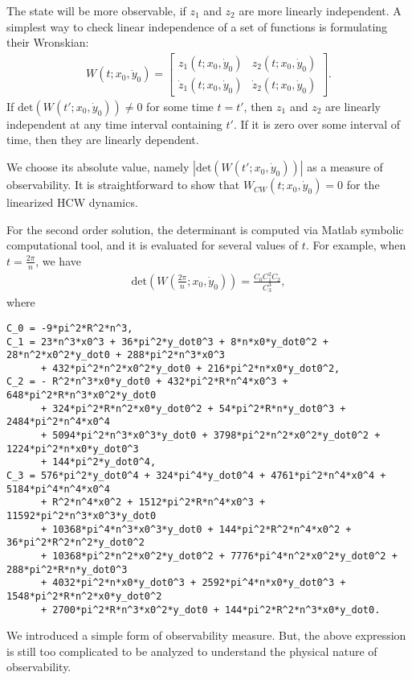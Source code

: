 \documentclass[10pt]{article}
\begin{document}
The state will be more observable, if $z_1$ and $z_2$ are more linearly independent. A simplest way to check linear independence of a set of functions is formulating their Wronskian:
\begin{align*}
W(t;x_0,\dot y_0) = \begin{bmatrix} z_1(t;x_0,\dot y_0) & z_2(t;x_0,\dot y_0)\\
\dot z_1(t;x_0,\dot y_0) & \dot z_2(t;x_0,\dot y_0)
\end{bmatrix}.
\end{align*}
If $\mathrm{det}(W(t';x_0,\dot y_0))\neq 0$ for some time $t=t'$, then $z_1$ and $z_2$ are linearly independent at any time interval containing $t'$. If it is zero over some interval of time, then they are linearly dependent.

We choose its absolute value, namely $|\mathrm{det}(W(t';x_0,\dot y_0))|$ as a measure of observability. It is straightforward to show that $W_{CW}(t;x_0,\dot y_0)=0$ for the linearized HCW dynamics. 

For the second order solution, the determinant is computed via Matlab symbolic computational tool, and it is evaluated for several values of $t$. For example, when $t=\frac{2\pi}{n}$, we have
\begin{align}
\mathrm{det}(W(\frac{2\pi}{n};x_0,\dot y_0)) = \frac{C_0 C_1^2 C_2}{C_3^3},
\end{align}
where
{\small
\begin{verbatim}
C_0 = -9*pi^2*R^2*n^3,
C_1 = 23*n^3*x0^3 + 36*pi^2*y_dot0^3 + 8*n*x0*y_dot0^2 + 28*n^2*x0^2*y_dot0 + 288*pi^2*n^3*x0^3 
      + 432*pi^2*n^2*x0^2*y_dot0 + 216*pi^2*n*x0*y_dot0^2,
C_2 = - R^2*n^3*x0*y_dot0 + 432*pi^2*R*n^4*x0^3 + 648*pi^2*R*n^3*x0^2*y_dot0 
      + 324*pi^2*R*n^2*x0*y_dot0^2 + 54*pi^2*R*n*y_dot0^3 + 2484*pi^2*n^4*x0^4 
      + 5094*pi^2*n^3*x0^3*y_dot0 + 3798*pi^2*n^2*x0^2*y_dot0^2 + 1224*pi^2*n*x0*y_dot0^3 
      + 144*pi^2*y_dot0^4,
C_3 = 576*pi^2*y_dot0^4 + 324*pi^4*y_dot0^4 + 4761*pi^2*n^4*x0^4 + 5184*pi^4*n^4*x0^4 
      + R^2*n^4*x0^2 + 1512*pi^2*R*n^4*x0^3 + 11592*pi^2*n^3*x0^3*y_dot0 
      + 10368*pi^4*n^3*x0^3*y_dot0 + 144*pi^2*R^2*n^4*x0^2 + 36*pi^2*R^2*n^2*y_dot0^2 
      + 10368*pi^2*n^2*x0^2*y_dot0^2 + 7776*pi^4*n^2*x0^2*y_dot0^2 + 288*pi^2*R*n*y_dot0^3 
      + 4032*pi^2*n*x0*y_dot0^3 + 2592*pi^4*n*x0*y_dot0^3 + 1548*pi^2*R*n^2*x0*y_dot0^2 
      + 2700*pi^2*R*n^3*x0^2*y_dot0 + 144*pi^2*R^2*n^3*x0*y_dot0.
\end{verbatim}}

We introduced a simple form of observability measure. But, the above expression is still too complicated to be analyzed to understand the physical nature of observability.
\end{document}
